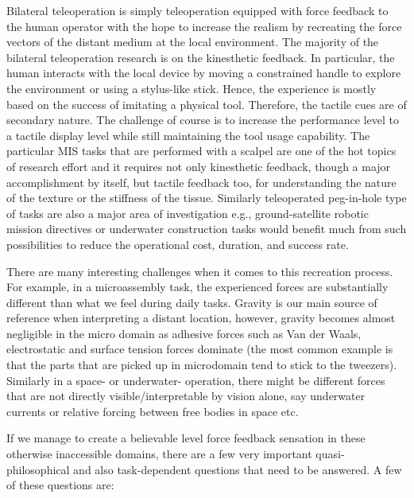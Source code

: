 Bilateral teleoperation is simply teleoperation equipped with force feedback to the human operator with the hope to increase the realism by recreating the force vectors of the distant medium at the local environment. The majority of the bilateral teleoperation research is on the kinesthetic feedback. In particular, the human interacts with the local device by moving a constrained handle to explore the environment or using a stylus-like stick. Hence, the experience is mostly based on the success of imitating a physical tool. Therefore, the tactile cues are of secondary nature. The challenge of course is to increase the performance level to a tactile display level while still maintaining the tool usage capability. The particular MIS tasks that are performed with a scalpel are one of the hot topics of research effort and it requires not only kinesthetic feedback, though a major accomplishment by itself, but tactile feedback too, for understanding the nature of the texture or the stiffness of the tissue. Similarly teleoperated peg-in-hole type of tasks are also a major area of investigation e.g., ground-satellite robotic mission directives or underwater construction tasks would benefit much from such possibilities to reduce the operational cost, duration, and success rate. 



There are many interesting challenges when it comes to this recreation process. For example, in a microassembly task, the experienced forces are substantially different than what we feel during daily tasks. Gravity is our main source of reference when interpreting a distant location, however, gravity becomes almost negligible in the micro domain as adhesive forces such as Van der Waals, electrostatic and surface tension forces dominate (the most common example is that the parts that are picked up in microdomain tend to stick to the tweezers). Similarly in a space- or underwater- operation, there might be different forces that are not directly visible/interpretable by vision alone, say underwater currents or relative forcing between free bodies in space etc.

If we manage to create a believable level force feedback sensation in these otherwise inaccessible domains, there are a few very important quasi-philosophical and also task-dependent questions that need to be answered. A few of these questions are:

